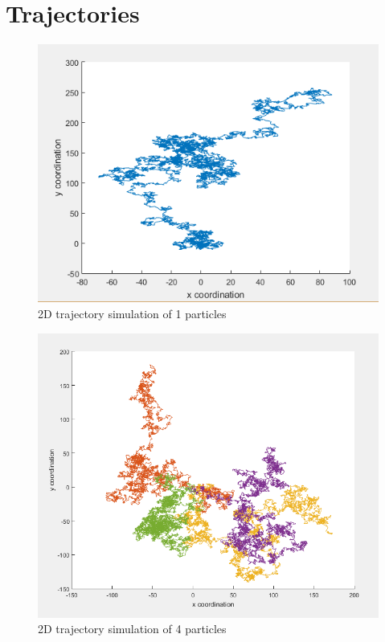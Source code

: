 \documentclass[a4paper,12pt]{article}
\begin{document}
\section{Trajectories}
\label{trajectory}
\begin{figure}[H]
\caption{2D trajectory simulation of 1 particles}
\includegraphics[scale=0.7]{trajectory}
\centering
\end{figure}
\begin{figure}[H]
\caption{2D trajectory simulation of 4 particles}
\includegraphics[scale=0.7]{trajectories}
\centering
\end{figure}
\end{document}
